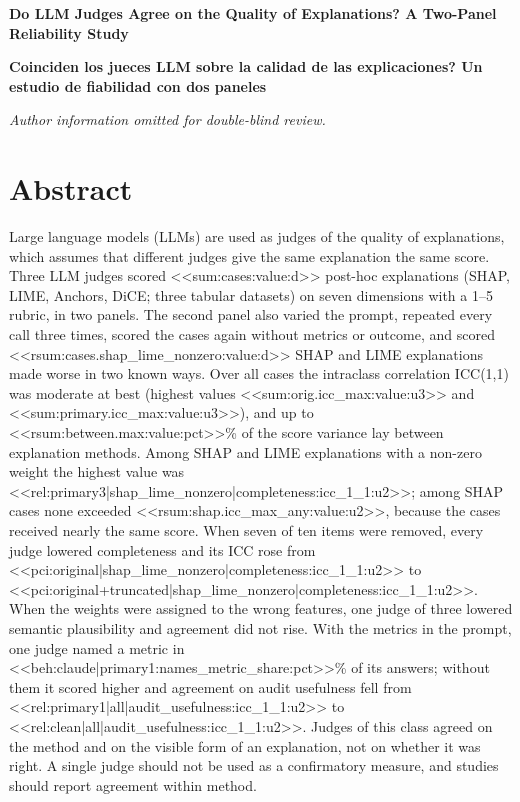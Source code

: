 \documentclass[12pt,letterpaper]{article}
\newif\iffull
\begin{document}
\begin{center}
{\large\bfseries Do LLM Judges Agree on the Quality of Explanations? A Two-Panel
Reliability Study\par}
\medskip
{\large\bfseries {\textquestiondown}Coinciden los jueces LLM sobre la calidad de las
explicaciones? Un estudio de fiabilidad con dos paneles\par}
\medskip
\iffull
Jonathan Herrera-V\'asquez\par
PhD candidate. Department of Computer Science, Universidad Americana de Europa
(UNADE), Canc\'un, Quintana Roo, Mexico.\par
jonnabio@gmail.com \quad ORCID: \url{https://orcid.org/0000-0002-7149-6635}
\else
\textit{Author information omitted for double-blind review.}
\fi
\end{center}

\section*{Abstract}
Large language models (LLMs) are used as judges of the quality of explanations, which
assumes that different judges give the same explanation the same score. Three LLM
judges scored <<sum:cases:value:d>> post-hoc
explanations (SHAP, LIME, Anchors, DiCE; three tabular datasets) on seven dimensions with
a 1--5 rubric, in two panels. The second panel also varied the
prompt, repeated every call three times, scored the cases again without metrics or
outcome, and scored <<rsum:cases.shap_lime_nonzero:value:d>> SHAP and LIME explanations
made worse in two known ways. Over all cases the intraclass correlation ICC(1,1) was
moderate at best (highest values
<<sum:orig.icc_max:value:u3>> and <<sum:primary.icc_max:value:u3>>), and up to
<<rsum:between.max:value:pct>>\% of the score variance lay between explanation methods.
Among SHAP and LIME explanations with a non-zero weight the highest value was
<<rel:primary3|shap_lime_nonzero|completeness:icc_1_1:u2>>; among SHAP cases none exceeded
<<rsum:shap.icc_max_any:value:u2>>, because the cases received nearly the same score. When
seven of ten items were removed, every judge lowered completeness and its ICC rose from
<<pci:original|shap_lime_nonzero|completeness:icc_1_1:u2>> to
<<pci:original+truncated|shap_lime_nonzero|completeness:icc_1_1:u2>>. When the weights
were assigned to the wrong features, one judge of three lowered semantic plausibility and
agreement did not rise. With the metrics in the prompt, one judge named a metric in
<<beh:claude|primary1:names_metric_share:pct>>\% of its answers; without them it
scored higher and agreement on audit usefulness fell from
<<rel:primary1|all|audit_usefulness:icc_1_1:u2>> to
<<rel:clean|all|audit_usefulness:icc_1_1:u2>>. Judges of this class agreed on the method
and on the visible form of an explanation, not on whether it was right. A single judge
should not be used as a confirmatory measure, and studies should report agreement
within method.
\end{document}

